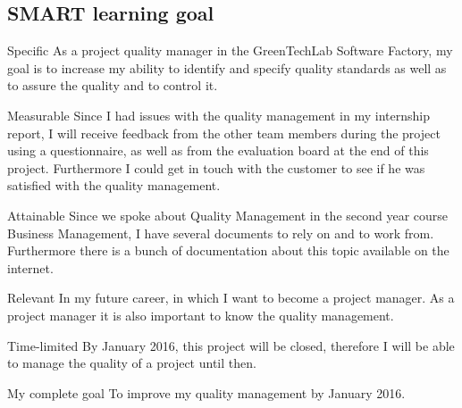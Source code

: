 \documentclass[12pt]{article}
\begin{document}
	\subsection{SMART learning goal}
	\begin{SMART}
	    \item[Specific] As a project quality manager in the GreenTechLab Software Factory, my goal is to increase my ability to identify and specify quality standards as well as to assure the quality and to control it.
	    \item[Measurable] Since I had issues with the quality management in my internship report, I will receive feedback from the other team members during the project using a questionnaire, as well as from the evaluation board at the end of this project. Furthermore I could get in touch with the customer to see if he was satisfied with the quality management.
	    \item[Attainable] Since we spoke about Quality Management in the second year course Business Management, I have several documents to rely on and to work from. Furthermore there is a bunch of documentation about this topic available on the internet.
	    \item[Relevant] In my future career, in which I want to become a project manager. As a project manager it is also important to know the quality management.
	    \item[Time-limited]By January 2016, this project will be closed, therefore I will be able to manage the quality of a project until then.
	    \item[My complete goal] To improve my quality management by January 2016.
	\end{SMART}
	
	
\end{document}

